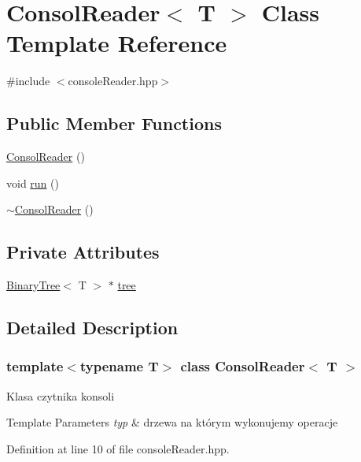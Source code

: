 \hypertarget{classConsolReader}{}\section{Consol\+Reader$<$ T $>$ Class Template Reference}
\label{classConsolReader}


{\ttfamily \#include $<$console\+Reader.\+hpp$>$}

\subsection*{Public Member Functions}
\begin{DoxyCompactItemize}
\item 
\hyperlink{classConsolReader_ac922e2362abb36d6a2675a1580a36f82}{Consol\+Reader} ()
\item 
void \hyperlink{classConsolReader_a5904bd97fa0b2ee76622b88d5cd17122}{run} ()
\item 
\hyperlink{classConsolReader_aeb98e5b65c25b0a96ba7094cbe69add3}{$\sim$\+Consol\+Reader} ()
\end{DoxyCompactItemize}
\subsection*{Private Attributes}
\begin{DoxyCompactItemize}
\item 
\hyperlink{classBinaryTree}{Binary\+Tree}$<$ T $>$ $\ast$ \hyperlink{classConsolReader_a11228c385559fb0f4379b5f0c4fadef5}{tree}
\end{DoxyCompactItemize}


\subsection{Detailed Description}
\subsubsection*{template$<$typename T$>$\newline
class Consol\+Reader$<$ T $>$}

Klasa czytnika konsoli 
\begin{DoxyTemplParams}{Template Parameters}
{\em typ} & drzewa na którym wykonujemy operacje \\
\hline
\end{DoxyTemplParams}


Definition at line 10 of file console\+Reader.\+hpp.




